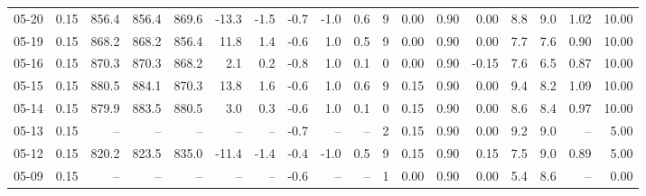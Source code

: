 \begin{threeparttable}
{\begin{tabular}{lrrrrrrrrrrrrrrrrr}
  05-20 &     0.15 & 856.4 & 856.4 & 869.6 &      -13.3 &           -1.5 &                      -0.7 &                     -1.0 &                 0.6 &              9 &       0.00 &      0.90 &           0.00 &              8.8 &                 9.0 &            1.02 &                  10.00 \\
  05-19 &     0.15 & 868.2 & 868.2 & 856.4 &       11.8 &            1.4 &                      -0.6 &                      1.0 &                 0.5 &              9 &       0.00 &      0.90 &           0.00 &              7.7 &                 7.6 &            0.90 &                  10.00 \\
  05-16 &     0.15 & 870.3 & 870.3 & 868.2 &        2.1 &            0.2 &                      -0.8 &                      1.0 &                 0.1 &              0 &       0.00 &      0.90 &          -0.15 &              7.6 &                 6.5 &            0.87 &                  10.00 \\
  05-15 &     0.15 & 880.5 & 884.1 & 870.3 &       13.8 &            1.6 &                      -0.6 &                      1.0 &                 0.6 &              9 &       0.15 &      0.90 &           0.00 &              9.4 &                 8.2 &            1.09 &                  10.00 \\
  05-14 &     0.15 & 879.9 & 883.5 & 880.5 &        3.0 &            0.3 &                      -0.6 &                      1.0 &                 0.1 &              0 &       0.15 &      0.90 &           0.00 &              8.6 &                 8.4 &            0.97 &                  10.00 \\
  05-13 &     0.15 &    -- &    -- &    -- &         -- &             -- &                      -0.7 &                       -- &                  -- &              2 &       0.15 &      0.90 &           0.00 &              9.2 &                 9.0 &              -- &                   5.00 \\
  05-12 &     0.15 & 820.2 & 823.5 & 835.0 &      -11.4 &           -1.4 &                      -0.4 &                     -1.0 &                 0.5 &              9 &       0.15 &      0.90 &           0.15 &              7.5 &                 9.0 &            0.89 &                   5.00 \\
  05-09 &     0.15 &    -- &    -- &    -- &         -- &             -- &                      -0.6 &                       -- &                  -- &              1 &       0.00 &      0.90 &           0.00 &              5.4 &                 8.6 &              -- &                   0.00 \\

\end{tabular}}
\end{threeparttable}
